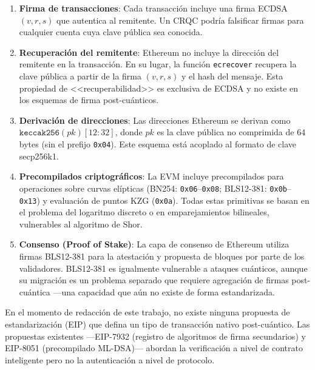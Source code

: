 \begin{enumerate}[label=\textbf{P\arabic*.}]
  \item \textbf{Firma de transacciones}: Cada transacción incluye una firma ECDSA $(v, r, s)$ que autentica al remitente. Un CRQC podría falsificar firmas para cualquier cuenta cuya clave pública sea conocida.
  
  \item \textbf{Recuperación del remitente}: Ethereum no incluye la dirección del remitente en la transacción. En su lugar, la función \texttt{ecrecover} recupera la clave pública a partir de la firma $(v, r, s)$ y el hash del mensaje. Esta propiedad de <<recuperabilidad>> es exclusiva de ECDSA y no existe en los esquemas de firma post-cuánticos.
  
  \item \textbf{Derivación de direcciones}: Las direcciones Ethereum se derivan como $\texttt{keccak256}(\mathit{pk})[12{:}32]$, donde $\mathit{pk}$ es la clave pública no comprimida de 64 bytes (sin el prefijo \texttt{0x04}). Este esquema está acoplado al formato de clave secp256k1.
  
  \item \textbf{Precompilados criptográficos}: La EVM incluye precompilados para operaciones sobre curvas elípticas (BN254: \texttt{0x06}--\texttt{0x08}; BLS12-381: \texttt{0x0b}--\texttt{0x13}) y evaluación de puntos KZG (\texttt{0x0a}). Todas estas primitivas se basan en el problema del logaritmo discreto o en emparejamientos bilineales, vulnerables al algoritmo de Shor.
  
  \item \textbf{Consenso (Proof of Stake)}: La capa de consenso de Ethereum utiliza firmas BLS12-381 para la atestación y propuesta de bloques por parte de los validadores. BLS12-381 es igualmente vulnerable a ataques cuánticos, aunque su migración es un problema separado que requiere agregación de firmas post-cuántica ---una capacidad que aún no existe de forma estandarizada.
\end{enumerate}

En el momento de redacción de este trabajo, no existe ninguna propuesta de estandarización (EIP) que defina un tipo de transacción nativo post-cuántico. Las propuestas existentes ---EIP-7932 \parencite{eip7932} (registro de algoritmos de firma secundarios) y EIP-8051 \parencite{eip8051} (precompilado ML-DSA)--- abordan la verificación a nivel de contrato inteligente pero no la autenticación a nivel de protocolo.


